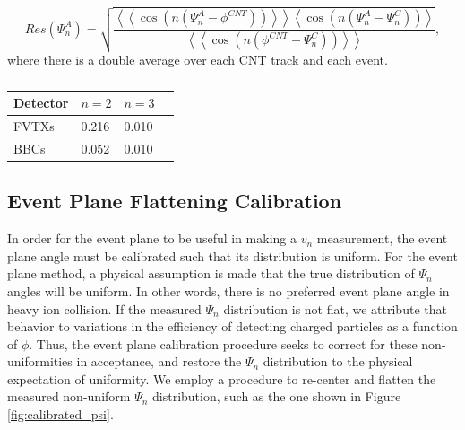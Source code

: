 \begin{equation}
Res(\Psi_n^A) = \sqrt{\frac{\left<\left<\cos(n(\Psi_n^A - \phi^{CNT}))\right>\right>\left<\cos(n(\Psi_n^A - \Psi_n^C))\right>}{\left<\left<\cos(n(\phi^{CNT} - \Psi_n^C))\right>\right>}},
\end{equation}
where there is a double average over each CNT track and each event.
\begin{table}[h!]
\caption{}
\begin{center}
    \begin{tabular}{| l | l | l | l |}
    \hline
    Detector & $n=2$ & $n=3$  \\ \hline
    FVTXs & 0.216 & 0.010 \\ \hline
    BBCs & 0.052 & 0.010  \\ \hline
    \end{tabular}
\end{center}
\label{tbl:std_resolutions}
\end{table}

\subsection{Event Plane Flattening Calibration}
In order for the event plane to be useful in making a $v_n$ measurement, the event plane angle must be calibrated such that its distribution is uniform. For the event plane method, a physical assumption is made that the true distribution of $\Psi_n$ angles will be uniform. In other words, there is no preferred event plane angle in heavy ion collision. If the measured $\Psi_n$ distribution is not flat, we attribute that behavior to variations in the efficiency of detecting charged particles as a function of $\phi$. Thus, the event plane calibration procedure seeks to correct for these non-uniformities in acceptance, and restore the $\Psi_n$ distribution to the physical expectation of uniformity. We employ a procedure to re-center and flatten the measured non-uniform $\Psi_n$ distribution, such as the one shown in Figure \ref{fig:calibrated_psi}.

